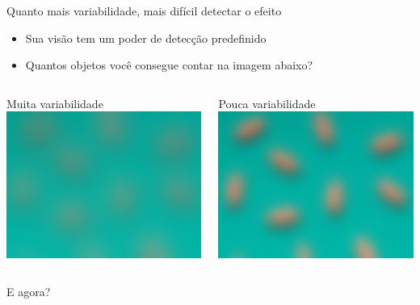 \documentclass{beamer}
\begin{document}
\begin{frame}{\scriptsize Quanto mais variabilidade, mais difícil detectar o efeito}
  \begin{itemize}
    \scriptsize
  \item Sua visão tem um poder de detecção predefinido
  \item Quantos objetos você consegue contar na imagem abaixo?
  \end{itemize}

  \bigskip
  \begin{columns}
    \begin{column}{5cm}
      \begin{exampleblock}{\scriptsize Muita variabilidade}
        \centering
        \includegraphics[width=\textwidth]{Cap10-11/analogia-var-poder-var100}
      \end{exampleblock}
    \end{column}
    \begin{column}{5cm}
      \begin{exampleblock}{\scriptsize Pouca variabilidade}
        \centering
        \includegraphics[width=\textwidth]{Cap10-11/analogia-var-poder-var050}
      \end{exampleblock}
    \end{column}
  \end{columns}
  \vfill
  \centering
  \scriptsize
  E agora?
\end{frame}
\end{document}
